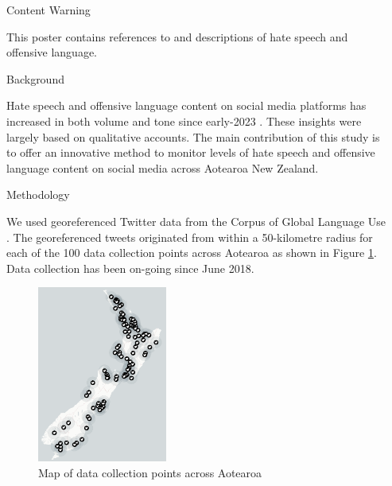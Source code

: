 \documentclass[final]{beamer}
\newlength{\sepwidth}
\newlength{\smallcolwidth}
\newcommand{\separatorcolumn}{\begin{column}{\sepwidth}\end{column}}
\begin{document}
\begin{frame}[t]
\begin{columns}[t]
\separatorcolumn

\begin{column}{\smallcolwidth}

    \begin{alertblock}{Content Warning}
  
   This poster contains references to and descriptions of hate speech and offensive language.

   \end{alertblock}
  
  \begin{block}{Background}
    
    Hate speech and offensive language content on social media platforms has increased in both volume and tone since early-2023 \cite{hattotuwa_transgressive_2023}. These insights were largely based on qualitative accounts. The main contribution of this study is to offer an innovative method to monitor levels of hate speech and offensive language content on social media across Aotearoa New Zealand.

  \end{block}
  
  \begin{block}{Methodology}

    We used georeferenced Twitter data from the Corpus of Global Language Use \cite{dunn_mapping_2020}. The georeferenced tweets originated from within a 50-kilometre radius for each of the 100 data collection points across Aotearoa as shown in Figure \ref{fig:1}. Data collection has been on-going since June 2018. 
  
    \begin{figure}
        \includegraphics[width=0.4\textwidth]{poster/figures/map_aotearoa.png}
        \caption{Map of data collection points across Aotearoa}
        \label{fig:1}
    \end{figure}


\end{block}
\end{column}
\end{columns}
\end{frame}
\end{document}
